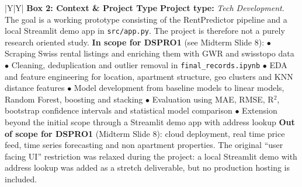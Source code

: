 \documentclass[11pt, a4paper]{article}
\begin{document}
{\begin{xltabular}{\textwidth}{|Y|Y|}
    \textbf{\color{accent}Box 2: Context \& Project Type} \newline
    \textbf{Project type:} \emph{Tech Development}. The goal is a working prototype consisting of the RentPredictor pipeline and a local Streamlit demo app in \texttt{src/app.py}. The project is therefore not a purely research oriented study.
    \newline\newline
    \textbf{In scope for DSPRO1} (see Midterm Slide 8):
    \newline $\bullet$ Scraping Swiss rental listings and enriching them with GWR and swisstopo data
    \newline $\bullet$ Cleaning, deduplication and outlier removal in \texttt{final\_records.ipynb}
    \newline $\bullet$ EDA and feature engineering for location, apartment structure, geo clusters and KNN distance features
    \newline $\bullet$ Model development from baseline models to linear models, Random Forest, boosting and stacking
    \newline $\bullet$ Evaluation using MAE, RMSE, R$^2$, bootstrap confidence intervals and statistical model comparison
    \newline $\bullet$ Extension beyond the initial scope through a Streamlit demo app with address lookup
    \newline\newline
    \textbf{Out of scope for DSPRO1} (Midterm Slide 8): cloud deployment, real time price feed, time series forecasting and non apartment properties. The original ``user facing UI'' restriction was relaxed during the project: a local Streamlit demo with address lookup was added as a stretch deliverable, but no production hosting is included.
    \\ \hline


\end{xltabular}}
\end{document}
